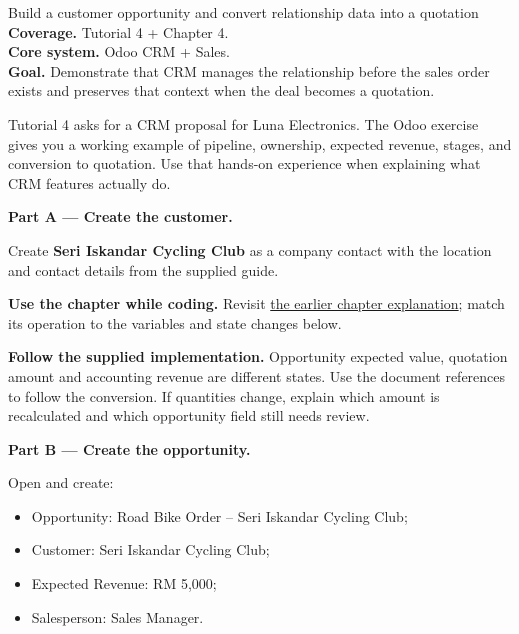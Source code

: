 
\begin{labproject}{Build a customer opportunity and convert relationship data into a quotation}
\textbf{Coverage.} Tutorial 4 + Chapter 4.\\
\textbf{Core system.} Odoo CRM + Sales.\\
\textbf{Goal.} Demonstrate that CRM manages the relationship before the sales order exists and preserves that context when the deal becomes a quotation.




\begin{labmode}
Tutorial 4 asks for a CRM proposal for Luna Electronics. The Odoo exercise gives you a working example of pipeline, ownership, expected revenue, stages, and conversion to quotation. Use that hands-on experience when explaining what CRM features actually do.
\end{labmode}

\medskip\noindent\textbf{Part A --- Create the customer.}

Create \textbf{Seri Iskandar Cycling Club} as a company contact with the location and contact details from the supplied guide.




\textbf{Use the chapter while coding.} Revisit \hyperref[ch:crm]{the earlier chapter explanation}; match its operation to the variables and state changes below.

\textbf{Follow the supplied implementation.} Opportunity expected value, quotation amount and accounting revenue are different states. Use the document references to follow the conversion. If quantities change, explain which amount is recalculated and which opportunity field still needs review.


\medskip\noindent\textbf{Part B --- Create the opportunity.}

Open  and create:
\begin{itemize}
  \item Opportunity: Road Bike Order -- Seri Iskandar Cycling Club;
  \item Customer: Seri Iskandar Cycling Club;
  \item Expected Revenue: RM 5,000;
  \item Salesperson: Sales Manager.
\end{itemize}


\end{labproject}
